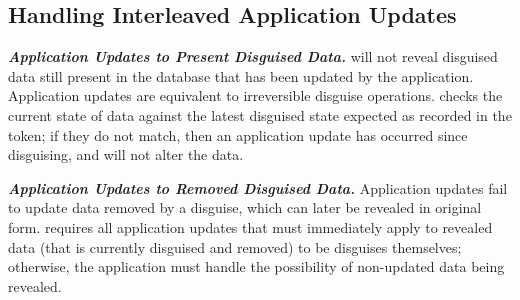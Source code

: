 \subsection{Handling Interleaved Application Updates}
\noindent\textbf{\emph{Application Updates to Present Disguised Data.}}
\sys will not reveal disguised data still present in the database that has been updated by the
application. Application updates are equivalent to irreversible disguise operations.
\sys checks the current state of data against the latest disguised state
expected as recorded in the token; if they do not match, then an application update has occurred
since disguising, and \sys will not alter the data.

\vspace{6pt}\noindent\textbf{\emph{Application Updates to Removed Disguised Data.}}
Application updates fail to update data removed by a disguise, which can later be revealed in
original form.
\sys requires all application updates that must immediately apply to revealed data (that is
currently disguised and removed) to be disguises themselves; otherwise, the application must handle
the possibility of non-updated data being revealed.



